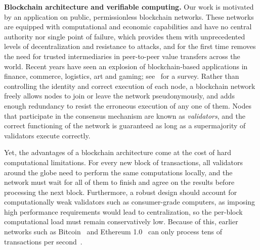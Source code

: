 \textbf{Blockchain architecture and verifiable computing.}
Our work is motivated by an application on public, permissionless blockchain networks. These networks are equipped with computational and economic capabilities and have no central authority nor single point of failure, which provides them with unprecedented levels of decentralization and resistance to attacks, and for the first time removes the need for trusted intermediaries in peer-to-peer value transfers across the world. Recent years have seen an explosion of blockchain-based applications in finance, commerce, logistics, art and gaming; see~\cite{maesa2020blockchain} for a survey. 
Rather than controlling the identity and correct execution of each node, a blockchain network freely allows nodes to join or leave the network pseudonymously, and adds enough redundancy to resist the erroneous execution of any one of them. 
Nodes that participate in the consensus mechanism are known as \emph{validators}, and the correct functioning of the network is guaranteed as long as a supermajority of validators execute correctly.

Yet, the advantages of a blockchain architecture come at the cost of hard computational limitations. For every new block of transactions, all validators around the globe need to perform the same computations locally, and the network must wait for all of them to finish and agree on the results before processing the next block. Furthermore, a robust design should account for computationally weak validators such as consumer-grade computers, as imposing high performance requirements would lead to centralization, so the per-block computational load must remain conservatively low. Because of this, earlier networks such as Bitcoin~\cite{nakamoto2019bitcoin} and Ethereum 1.0~\cite{wood2014ethereum} can only process tens of transactions per second~\cite{chauhan2018blockchain}. 


